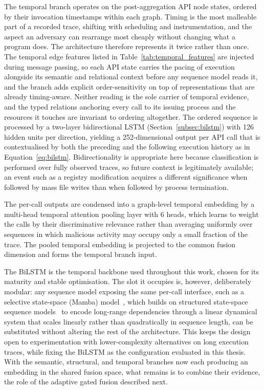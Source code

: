 \documentclass[%
    BCOR=10mm,
    DIV=13,
    toc=bibliography,
    toc=listof,
    oneside,
    12pt,
]{scrbook}
\begin{document}
The temporal branch operates on the post-aggregation API node states, ordered
by their invocation timestamps within each graph. Timing is the most malleable
part of a recorded trace, shifting with scheduling and instrumentation, and the
aspect an adversary can rearrange most cheaply without changing what a program
does. The architecture therefore represents it twice rather than once. The
temporal edge features listed in Table~\ref{tab:temporal_features} are injected
during message passing, so each API state carries the pacing of execution
alongside its semantic and relational context before any sequence model reads
it, and the branch adds explicit order-sensitivity on top of representations
that are already timing-aware. Neither reading is the sole carrier of temporal
evidence, and the typed relations anchoring every call to its issuing process
and the resources it touches are invariant to ordering altogether. The
ordered sequence is processed by a two-layer bidirectional LSTM
(Section~\ref{subsec:bilstm}) with 126 hidden units per direction, yielding a
252-dimensional output per API call that is contextualised by both the
preceding and the following execution history as in
Equation~\ref{eq:bilstm}. Bidirectionality is appropriate here because
classification is performed over fully observed traces, so future context is
legitimately available; an event such as a registry modification acquires a
different significance when followed by mass file writes than when followed by
process termination.

The per-call outputs are condensed into a graph-level temporal embedding by a
multi-head temporal attention pooling layer with 6 heads, which learns to
weight the calls by their discriminative relevance rather than averaging
uniformly over sequences in which malicious activity may occupy only a small
fraction of the trace. The pooled temporal embedding is
projected to the common fusion dimension and forms the temporal branch input.

The BiLSTM is the temporal backbone used throughout this work, chosen for its
maturity and stable optimisation. The slot it occupies is, however,
deliberately modular: any sequence model exposing the same per-call interface,
such as a selective state-space (Mamba) model~\cite{gu2023mamba}, which builds
on structured state-space sequence models~\cite{gu2022s4} to encode long-range
dependencies through a linear dynamical system that scales linearly rather than
quadratically in sequence length, can be substituted without altering the rest
of the architecture. This keeps the design open to experimentation with
lower-complexity alternatives on long execution traces, while fixing the BiLSTM
as the configuration evaluated in this thesis. With the semantic, structural,
and temporal branches now each producing an
embedding in the shared fusion space, what remains is to combine their evidence,
the role of the adaptive gated fusion described next.
\end{document}
